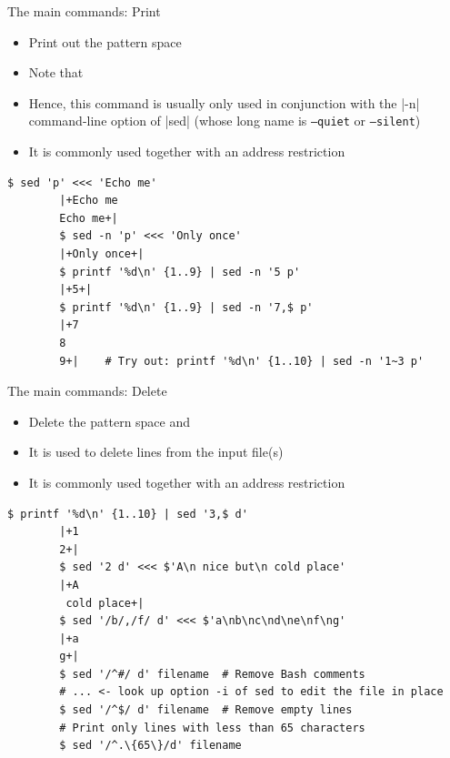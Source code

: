 \begin{frame}[fragile]{The main commands: Print}
    \vspace{-1mm}
    \begin{itemize}
        \item Print out the pattern space
        \item Note that 
        \item Hence, this command is usually only used in conjunction with the \bash|-n| command-line option of \bash|sed| (whose long name is \texttt{--quiet} or \texttt{--silent})
        \item It is commonly used together with an address restriction
    \end{itemize}
    \begin{lstlisting}[style=MyBash]
        $ sed 'p' <<< 'Echo me'
        |+Echo me
        Echo me+|
        $ sed -n 'p' <<< 'Only once'
        |+Only once+|
        $ printf '%d\n' {1..9} | sed -n '5 p'
        |+5+|
        $ printf '%d\n' {1..9} | sed -n '7,$ p'
        |+7
        8
        9+|    # Try out: printf '%d\n' {1..10} | sed -n '1~3 p'
    \end{lstlisting}
\end{frame}
\begin{frame}[fragile]{The main commands: Delete}
    \vspace{-1mm}
    \begin{itemize}
        \item Delete the pattern space and 
        \item It is used to delete lines from the input file(s)
        \item It is commonly used together with an address restriction
    \end{itemize}
    \medskip
    \begin{lstlisting}[style=MyBash]
        $ printf '%d\n' {1..10} | sed '3,$ d'
        |+1
        2+|
        $ sed '2 d' <<< $'A\n nice but\n cold place'
        |+A
         cold place+|
        $ sed '/b/,/f/ d' <<< $'a\nb\nc\nd\ne\nf\ng'
        |+a
        g+|
        $ sed '/^#/ d' filename  # Remove Bash comments
        # ... <- look up option -i of sed to edit the file in place
        $ sed '/^$/ d' filename  # Remove empty lines
        # Print only lines with less than 65 characters
        $ sed '/^.\{65\}/d' filename
    \end{lstlisting}
\end{frame}
